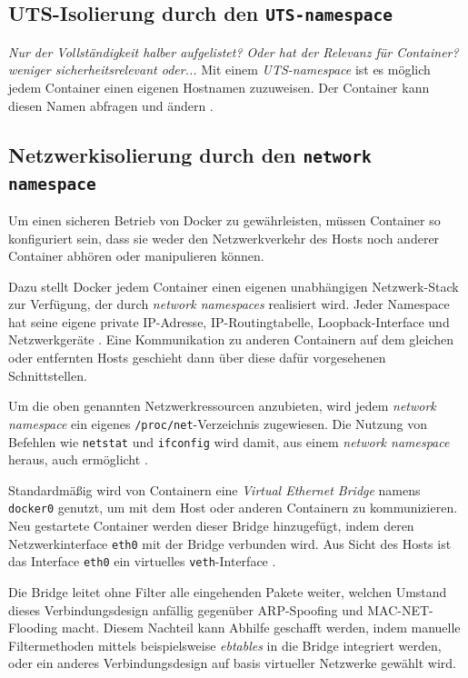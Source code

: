 \documentclass[../main.tex]{subfiles}
\begin{document}
			\cite[S.4]{dockerSec1}


    \subsection{\acrshort{UTS}-Isolierung durch den \texttt{\acrshort{UTS}-namespace}}
			\emph{Nur der Vollständigkeit halber aufgelistet? Oder hat der Relevanz für Container?}
			\emph{weniger sicherheitsrelevant oder...}
			Mit einem \emph{\acrshort{UTS}-namespace} ist es möglich jedem Container einen eigenen Hostnamen zuzuweisen. Der Container kann diesen Namen abfragen und ändern \cite[S.3]{virtVSContainer}.
    \subsection{Netzwerkisolierung durch den \texttt{network namespace}}
			Um einen sicheren Betrieb von Docker zu gewährleisten, müssen Container so konfiguriert sein, dass sie weder den Netzwerkverkehr des Hosts noch anderer Container abhören oder manipulieren können.

			Dazu stellt Docker jedem Container einen eigenen unabhängigen Netzwerk-Stack zur Verfügung, der durch \emph{network namespaces} realisiert wird. Jeder Namespace hat seine eigene private IP-Adresse, IP-Routingtabelle, Loopback-Interface und Netzwerkgeräte \cite[S.2+3]{virtVSContainer}. Eine Kommunikation zu anderen Containern auf dem gleichen oder entfernten Hosts geschieht dann über diese dafür vorgesehenen Schnittstellen.

			Um die oben genannten Netzwerkressourcen anzubieten, wird jedem \emph{network namespace} ein eigenes \texttt{/proc/net}-Verzeichnis zugewiesen. Die Nutzung von Befehlen wie \texttt{netstat} und \texttt{ifconfig} wird damit, aus einem \emph{network namespace} heraus, auch ermöglicht \cite[S.7]{IBMcheckpointRestart}.

			Standardmäßig wird von Containern eine \emph{Virtual Ethernet Bridge} namens \texttt{docker0} genutzt, um mit dem Host oder anderen Containern zu kommunizieren. Neu gestartete Container werden dieser Bridge hinzugefügt, indem deren Netzwerkinterface \texttt{eth0} mit der Bridge verbunden wird. Aus Sicht des Hosts ist das Interface \texttt{eth0} ein virtuelles \texttt{veth}-Interface \cite[S.3]{virtVSContainer}.

			Die Bridge leitet ohne Filter alle eingehenden Pakete weiter, welchen Umstand dieses Verbindungsdesign anfällig gegenüber \acrshort{ARP}-Spoofing und \acrshort{MAC-NET}-Flooding macht. Diesem Nachteil kann Abhilfe geschafft werden, indem manuelle Filtermethoden mittels beispielsweise \emph{ebtables} in die Bridge integriert werden, oder ein anderes Verbindungsdesign auf basis virtueller Netzwerke gewählt wird.
\end{document}
